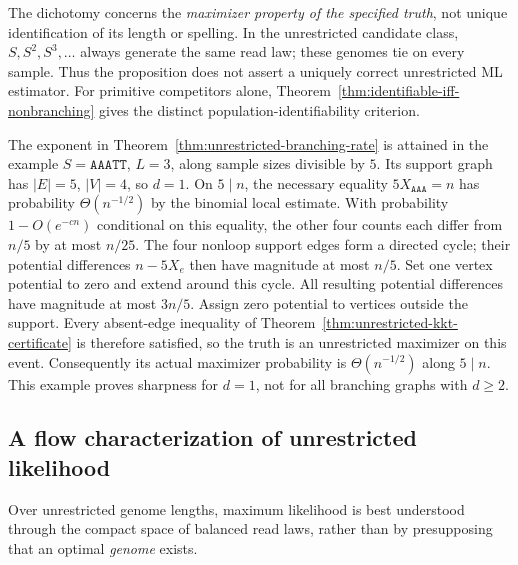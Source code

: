 The dichotomy concerns the \emph{maximizer property of
the specified truth}, not unique identification of its
length or spelling. In the unrestricted candidate class,
$S,S^2,S^3,\ldots$ always generate the same read law;
these genomes tie on every sample. Thus the proposition
does not assert a uniquely correct unrestricted ML
estimator. For primitive competitors alone,
Theorem~\ref{thm:identifiable-iff-nonbranching}
gives the distinct population-identifiability criterion.



\begin{remark}
\label{rem:branching-one-direction-sharpness}
The exponent in Theorem~\ref{thm:unrestricted-branching-rate}
is attained in the example $S=\texttt{AAATT}$, $L=3$,
along sample sizes divisible by $5$. Its support graph has
$|E|=5$, $|V|=4$, so $d=1$. On $5\mid n$,
the necessary equality $5X_{\texttt{AAA}}=n$ has probability
$\Theta(n^{-1/2})$ by the binomial local estimate.
With probability $1-O(e^{-cn})$ conditional on this equality,
the other four counts each differ from $n/5$ by at most
$n/25$. The four nonloop support edges form a directed
cycle; their potential differences
$n-5X_e$ then have magnitude at most $n/5$.
Set one vertex potential to zero and extend around this cycle.
All resulting potential differences have magnitude at most
$3n/5$. Assign zero potential to vertices outside the support.
Every absent-edge inequality of
Theorem~\ref{thm:unrestricted-kkt-certificate} is therefore
satisfied, so the truth is an unrestricted maximizer on
this event. Consequently its actual maximizer probability is
$\Theta(n^{-1/2})$ along $5\mid n$.
This example proves sharpness for $d=1$, not for all
branching graphs with $d\ge2$.
\end{remark}

\subsection{A flow characterization of unrestricted likelihood}
\label{sec:finite:flow-supremum}

Over unrestricted genome lengths, maximum likelihood is best
understood through the compact space of balanced read laws,
rather than by presupposing that an optimal \emph{genome} exists.

